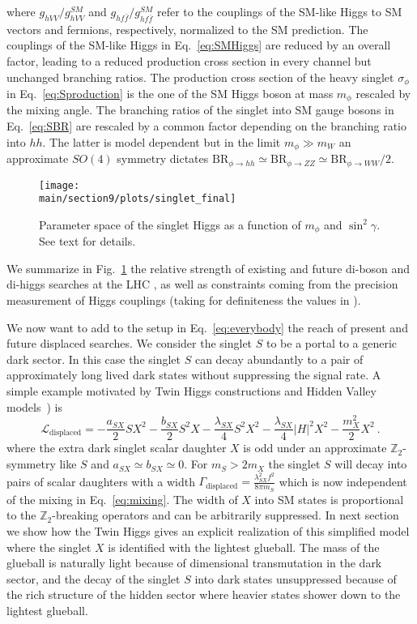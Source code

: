 where $g_{hVV}/g_{hVV}^{SM}$ and $g_{hf\bar f}/g_{hf\bar f}^{SM}$ refer to the couplings of the SM-like Higgs to SM vectors and fermions, respectively, normalized to the SM prediction. The couplings of the SM-like Higgs in Eq.~\ref{eq:SMHiggs} are reduced by an overall factor, leading to a reduced production cross section in every channel but unchanged branching ratios. The production cross section of the heavy singlet $\sigma_\phi$ in Eq.~\ref{eq:Sproduction} is the one of the SM Higgs boson at mass $m_\phi$ rescaled by the mixing angle.  The branching ratios of the singlet into SM gauge bosons in Eq.~\eqref{eq:SBR} are rescaled by a common factor depending on the branching ratio into $hh$. The latter is model dependent but in the limit $m_\phi\gg m_W$ an approximate $SO(4)$ symmetry dictates $\text{BR}_{\phi\to hh }\simeq \text{BR}_{\phi\to ZZ}\simeq \text{BR}_{\phi\to WW} /2$.

\begin{figure}[t]
\texttt{[image: \\main/section9/plots/singlet\_final]}
\centering
\caption{Parameter space of the singlet Higgs as a function of $m_\phi$ and $\sin^2 \gamma$. See text for details.
\label{fig:singlet}
}
\end{figure}
We summarize in Fig.~\ref{fig:singlet} the relative strength of existing and future di-boson and di-higgs searches at the LHC \cite{Sirunyan:2018qlb,Aaboud:2018knk,Sirunyan:2017isc,ATLAS:2017spa}, as well as constraints coming from the precision measurement of Higgs couplings (taking for definiteness the values in \cite{Dawson:2013bba}). 

We now want to add to the setup in Eq.~\ref{eq:everybody} the reach of present and future displaced searches.  We consider the singlet $S$ to be a portal to a generic dark sector. In this case the singlet $S$ can decay abundantly to a pair of approximately long lived  dark states without suppressing the signal rate. A simple example motivated by Twin Higgs constructions \cite{Craig:2015pha} and Hidden Valley models~\cite{Strassler:2006ri,Han:2007ae}) is 
\begin{equation}
\mathcal{L}_{\text{displaced}}=-\frac{a_{SX}}{2} S X^2-\frac{b_{SX}}{2} S^2 X-\frac{\lambda_{SX}}{4} S^2 X^2-\frac{\lambda_{SX}}{4} \vert H\vert^2 X^2-\frac{m_X^2}{2} X^2\ .
\end{equation} 
where  the extra dark singlet scalar daughter $X$ is odd under an approximate $\mathbb{Z}_2$-symmetry like $S$ and $a_{SX}\simeq b_{SX}\simeq0$. For $m_S>2 m_X$ the singlet $S$ will decay into pairs of scalar daughters with a width $\Gamma_{\text{displaced}}=\frac{\lambda_{SX}^2 f^2}{8\pi m_S}$ which is now independent of the mixing in Eq.~\ref{eq:mixing}. The width of $X$ into SM states is proportional to the $\mathbb{Z}_2$-breaking operators and can be arbitrarily suppressed. In next section we show how the Twin Higgs gives an explicit realization of this simplified model where the singlet $X$ is identified with the lightest glueball. The mass of the glueball is naturally light because of dimensional transmutation in the dark sector, and the decay of the singlet $S$ into dark states unsuppressed because of the rich structure of the hidden sector where heavier states shower down to the lightest glueball. 


